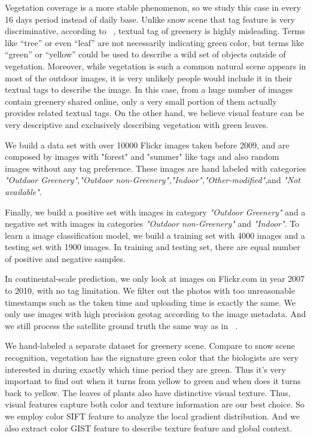 Vegetation coverage is a more stable phenomenon, so we study this case in every 16 days period instead of daily base.
Unlike snow scene that 
tag feature is very discriminative, according 
to ~\cite{ecology2012www}, textual tag of greenery is highly misleading. 
Terms like ``tree'' or even ``leaf'' are not necessarily 
indicating green color, but terms like ``green'' or 
``yellow'' could be used to describe a wild set of objects outside of vegetation. Moreover, while vegetation is 
such a common natural scene appears in most of the outdoor images, it is very unlikely people would include it in their textual tags 
to describe the image. In this case, from a huge number of images contain greenery shared online, only a very small portion of them 
actually provides related textual tags. On the other hand, we believe visual feature can be very descriptive and exclusively 
describing vegetation with green leaves.



We build a data set with over 10000 Flickr images taken before 2009, and are composed by images with "forest" and "summer" like tags 
and also random images without any tag preference. These images are hand labeled with categories 
\textit{"Outdoor Greenery","Outdoor non-Greenery","Indoor","Other-modified"},and \textit{"Not available"}.

Finally, we build a positive set with images in category \textit{"Outdoor Greenery"} and a negative set 
with images in categories \textit{"Outdoor non-Greenery"} and \textit{"Indoor"}. To learn a image classification model, 
we build a training set with 4000 images and a testing set with 1900 images. 
In training and testing set, there are equal number of positive and negative samples.

In continental-scale prediction, we only look at images on Flickr.com in year 2007 to 2010, with no tag limitation. 
We filter out the photos with too unreasonable timestamps such as the taken time and uploading time is exactly the same.
We only use images with high precision geotag according to the image metadata. And we still process the 
satellite ground truth the same way as in ~\cite{ecology2012www}.



We hand-labeled a separate dataset for greenery scene.
Compare to snow scene recognition,
vegetation has the signature green color that the  
biologists are very interested in during exactly which time period they are green. 
Thus it's very important 
to find out when it turns from yellow to green and when does it turns back to yellow.
The leaves of plants also have distinctive visual texture. 
Thus, visual features capture both color and texture information are our best choice.
So we employ color SIFT feature to analyze the local gradient distribution. 
And we also extract color GIST feature to describe texture feature and global context. 


